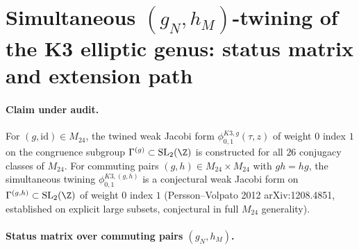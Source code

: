 
\providecommand{\ClaimStatusTheorem}{\textbf{[Theorem]}}
\providecommand{\ClaimStatusConjectured}{\textbf{[Conjecture]}}
\providecommand{\ClaimStatusAxiomatic}{\textbf{[Axiom]}}
\providecommand{\ZellK}[2]{Z^{(#1,#2)}_{\mathrm{ell}}(K3)}
\providecommand{\phiKg}{\phi^{K3, g}_{0,1}}
\providecommand{\phiKgh}{\phi^{K3,(g,h)}_{0,1}}
\providecommand{\CM}{C_{M_{24}}}

\section*{Simultaneous $(g_N,h_M)$-twining of the K3 elliptic genus:
status matrix and extension path}

\paragraph{Claim under audit.}
For $(g,\mathrm{id})\in M_{24}$, the twined weak Jacobi form
$\phiKg(\tau,z)$ of weight $0$ index $1$ on the congruence subgroup
$\Gamma^{(g)}\subset \mathrm{SL}_2(\Z)$ is constructed for all $26$
conjugacy classes of $M_{24}$.  For commuting pairs
$(g,h)\in M_{24}\times M_{24}$ with $gh=hg$, the simultaneous twining
$\phiKgh$ is a conjectural weak Jacobi form on
$\Gamma^{(g,h)}\subset \mathrm{SL}_2(\Z)$ of weight $0$ index $1$
(Persson--Volpato 2012 arXiv:1208.4851, established on explicit
large subsets, conjectural in full $M_{24}$ generality).

\paragraph{Status matrix over commuting pairs $(g_N,h_M)$.}

